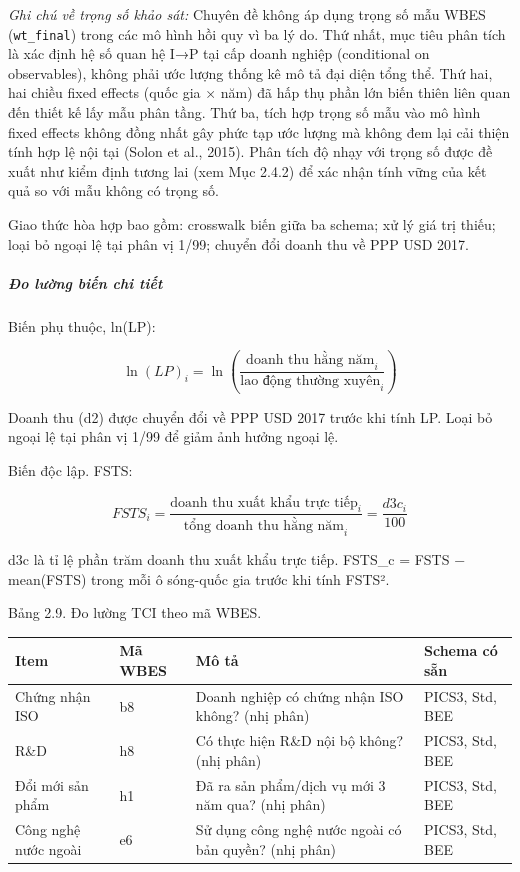 \documentclass[12pt,a4paper]{article}
\begin{document}
\emph{Ghi chú về trọng số khảo sát:} Chuyên đề không áp dụng trọng số
mẫu WBES (\texttt{wt\_final}) trong các mô hình hồi quy vì ba lý do. Thứ
nhất, mục tiêu phân tích là xác định hệ số quan hệ I→P tại cấp doanh
nghiệp (conditional on observables), không phải ước lượng thống kê mô tả
đại diện tổng thể. Thứ hai, hai chiều fixed effects (quốc gia × năm) đã
hấp thụ phần lớn biến thiên liên quan đến thiết kế lấy mẫu phân tầng.
Thứ ba, tích hợp trọng số mẫu vào mô hình fixed effects không đồng nhất
gây phức tạp ước lượng mà không đem lại cải thiện tính hợp lệ nội tại
(Solon et al., 2015). Phân tích độ nhạy với trọng số được đề xuất như
kiểm định tương lai (xem Mục 2.4.2) để xác nhận tính vững của kết quả so
với mẫu không có trọng số.

Giao thức hòa hợp bao gồm: crosswalk biến giữa ba schema; xử lý giá trị
thiếu; loại bỏ ngoại lệ tại phân vị 1/99; chuyển đổi doanh thu về PPP
USD 2017.

\hypertarget{ux111o-lux1b0ux1eddng-biux1ebfn-chi-tiux1ebft}{%
\subparagraph{Đo lường biến chi
tiết}\label{ux111o-lux1b0ux1eddng-biux1ebfn-chi-tiux1ebft}}

Biến phụ thuộc, ln(LP):

\[\ln(LP)_i = \ln\left(\frac{\text{doanh thu hằng năm}_i}{\text{lao động thường xuyên}_i}\right)\]

Doanh thu (d2) được chuyển đổi về PPP USD 2017 trước khi tính LP. Loại
bỏ ngoại lệ tại phân vị 1/99 để giảm ảnh hưởng ngoại lệ.

Biến độc lập. FSTS:

\[FSTS_i = \frac{\text{doanh thu xuất khẩu trực tiếp}_i}{\text{tổng doanh thu hằng năm}_i} = \frac{d3c_i}{100}\]

d3c là tỉ lệ phần trăm doanh thu xuất khẩu trực tiếp. FSTS\_c = FSTS −
mean(FSTS) trong mỗi ô sóng-quốc gia trước khi tính FSTS².

Bảng 2.9. Đo lường TCI theo mã WBES.

\begin{longtable}[]{@{}llll@{}}
\toprule\noalign{}
Item & Mã WBES & Mô tả & Schema có sẵn \\
\midrule\noalign{}
\endhead
\bottomrule\noalign{}
\endlastfoot
Chứng nhận ISO & b8 & Doanh nghiệp có chứng nhận ISO không? (nhị phân) &
PICS3, Std, BEE \\
R\&D & h8 & Có thực hiện R\&D nội bộ không? (nhị phân) & PICS3, Std,
BEE \\
Đổi mới sản phẩm & h1 & Đã ra sản phẩm/dịch vụ mới 3 năm qua? (nhị phân)
& PICS3, Std, BEE \\
Công nghệ nước ngoài & e6 & Sử dụng công nghệ nước ngoài có bản quyền?
(nhị phân) & PICS3, Std, BEE \\
\end{longtable}
\end{document}
